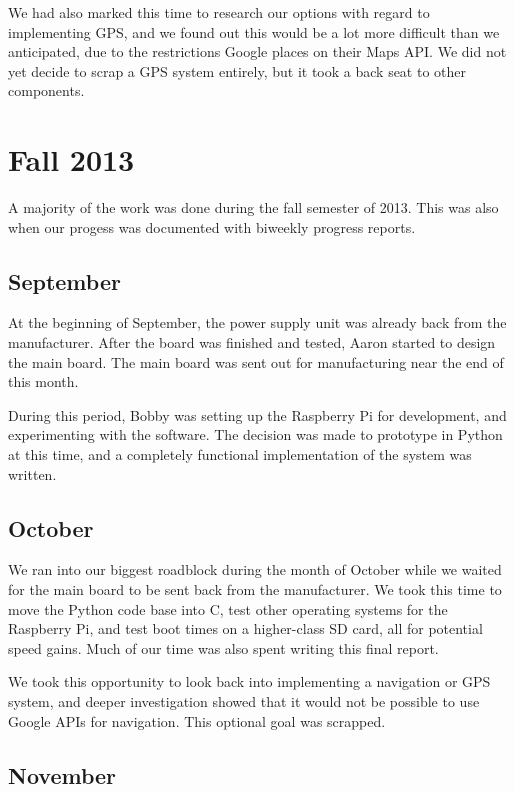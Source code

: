 We had also marked this time to research our options with regard to
implementing GPS, and we found out this would be a lot more difficult than
we anticipated, due to the restrictions Google places on their Maps API.
We did not yet decide to scrap a GPS system entirely, but it took a
back seat to other components.

\section{Fall 2013}

A majority of the work was done during the fall semester of 2013. This was also
when our progess was documented with biweekly progress reports.

\subsection{September}

At the beginning of September, the power supply unit was already back from the
manufacturer. After the board was finished and tested, Aaron started to design
the main board. The main board was sent out for manufacturing near the end
of this month.

During this period, Bobby was setting up the Raspberry Pi for development, and
experimenting with the software. The decision was made to prototype in Python
at this time, and a completely functional implementation of the system was written.

\subsection{October}

We ran into our biggest roadblock during the month of October while we waited
for the main board to be sent back from the manufacturer. We took this time to
move the Python code base into C, test other
operating systems for the Raspberry Pi, and test boot times on a higher-class
SD card, all for potential speed gains. Much of our time was also spent writing
this final report.

We took this opportunity to look back into implementing a navigation or GPS
system, and deeper investigation showed that it would not be possible to use
Google APIs for navigation. This optional goal was scrapped.

\subsection{November}

